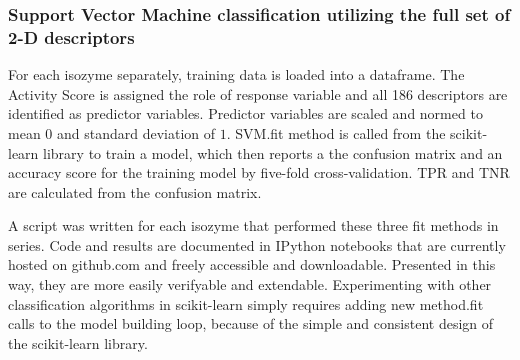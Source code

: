 \subsubsection{Support Vector Machine classification utilizing the full set of 2-D descriptors}
For each isozyme separately, training data is loaded into a dataframe. The Activity Score is assigned the role of response variable and all 186  descriptors are identified as predictor variables. Predictor variables are scaled and normed to mean $0$ and standard deviation of $1$. SVM.fit method is called from the scikit-learn library to train a model, which then reports a the confusion matrix and an accuracy score for the training model by five-fold cross-validation. TPR and TNR are calculated from the confusion matrix.

A script was written for each isozyme that performed these three fit methods in series. Code and results are documented in IPython notebooks that are currently hosted on github.com and freely accessible and downloadable. Presented in this way, they are more easily verifyable and extendable. Experimenting with other classification algorithms in scikit-learn simply requires adding new method.fit calls to the model building loop, because of the simple and consistent design of the scikit-learn library.

